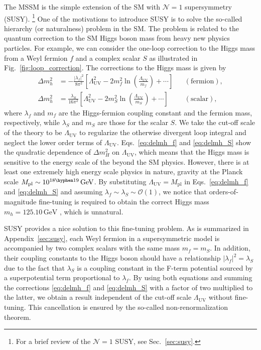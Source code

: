 \documentclass[12pt,twoside,book]{article}
\begin{document}
The MSSM is the simple extension of the SM with $\mathcal{N} = 1$ supersymmetry (SUSY).
\footnote{
  For a brief review of the $\mathcal{N} = 1$ SUSY, see Sec.~\ref{sec:susy}.
}
One of the motivations to introduce SUSY is to solve the so-called hierarchy (or naturalness) problem \cite{Weinberg:1975gm,Gildener:1976ai,Susskind:1978ms} in the SM.
The problem is related to the quantum correction to the SM Higgs boson mass from heavy new physics particles.
For example, we can consider the one-loop correction to the Higgs mass from a Weyl fermion $f$ and a complex scalar $S$ as illustrated in Fig.~\ref{fig:loop_correction}.
The corrections to the Higgs mass is given by
\begin{align}
  \Delta m_h^2 &= -\frac{|\lambda_f|^2}{8 \pi^2} \left[
  \Lambda_{\mathrm{UV}}^2 - 2 m_f^2 \ln \left( \frac{\Lambda_{\mathrm{UV}}}{m_f} \right)
  + \cdots \right] & &\mathrm{(fermion)}, \label{eq:delmh_f}\\
  \Delta m_h^2 &= \frac{\lambda_S}{16 \pi^2} \left[
  \Lambda_{\mathrm{UV}}^2 - 2 m_S^2 \ln \left( \frac{\Lambda_{\mathrm{UV}}}{m_S} \right)
  + \cdots \right] & &\mathrm{(scalar)}, \label{eq:delmh_S}
\end{align}
where $\lambda_f$ and $m_f$ are the Higgs-fermion coupling constant and the fermion mass, respectively, while $\lambda_S$ and $m_S$ are those for the scalar $S$.
We take the cut-off scale of the theory to be $\Lambda_{\mathrm{UV}}$ to regularize the otherwise divergent loop integral and neglect the lower order terms of $\Lambda_{\mathrm{UV}}$.
Eqs.~\eqref{eq:delmh_f} and \eqref{eq:delmh_S} show the quadratic dependence of $\Delta m_H^2$ on $\Lambda_{\mathrm{UV}}$, which means that the Higgs mass is sensitive to the energy scale of the beyond the SM physics.
However, there is at least one extremely high energy scale physics in nature, gravity at the Planck scale $M_{\mathrm{pl}} \sim 10^{18 \hyphen 19}\,\mathrm{GeV}$.
By substituting $\Lambda_{\mathrm{UV}} = M_{\mathrm{pl}}$ in Eqs.~\eqref{eq:delmh_f} and \eqref{eq:delmh_S} and assuming $\lambda_f \sim \lambda_S \sim \mathcal{O} (1)$, we notice that orders-of-magnitude fine-tuning is required to obtain the correct Higgs mass $m_h = 125.10\,\mathrm{GeV}$ \cite{Tanabashi:2018oca}, which is unnatural.

SUSY provides a nice solution to this fine-tuning problem.
As is summarized in Appendix~\ref{sec:susy}, each Weyl fermion in a supersymmetric model is accompanied by two complex scalars with the same mass $m_f = m_S$.
In addition, their coupling constants to the Higgs boson should have a relationship $|\lambda_f|^2 = \lambda_S$ due to the fact that $\lambda_S$ is a coupling constant in the F-term potential sourced by a superpotential term proportional to $\lambda_f$.
By using both equations and summing the corrections \eqref{eq:delmh_f} and \eqref{eq:delmh_S} with a factor of two multiplied to the latter, we obtain a result independent of the cut-off scale $\Lambda_{\mathrm{UV}}$ without fine-tuning.
This cancellation is ensured by the so-called non-renormalization theorem. \cite{Salam:1974jj, Grisaru:1979wc}
\end{document}
